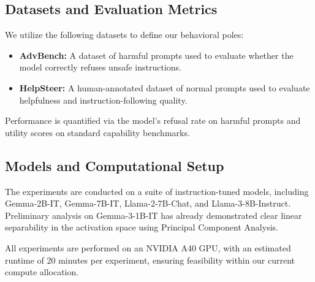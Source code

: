 \subsection{Datasets and Evaluation Metrics}
We utilize the following datasets to define our behavioral poles:
\begin{itemize}
    \item \textbf{AdvBench:} A dataset of harmful prompts used to evaluate whether the model correctly refuses unsafe instructions.
    \item \textbf{HelpSteer:} A human-annotated dataset of normal prompts used to evaluate helpfulness and instruction-following quality.
\end{itemize}
Performance is quantified via the model's refusal rate on harmful prompts and utility scores on standard capability benchmarks.

\subsection{Models and Computational Setup}
The experiments are conducted on a suite of instruction-tuned models, including Gemma-2B-IT, Gemma-7B-IT, Llama-2-7B-Chat, and Llama-3-8B-Instruct. Preliminary analysis on Gemma-3-1B-IT has already demonstrated clear linear separability in the activation space using Principal Component Analysis.

All experiments are performed on an NVIDIA A40 GPU, with an estimated runtime of 20 minutes per experiment, ensuring feasibility within our current compute allocation.
